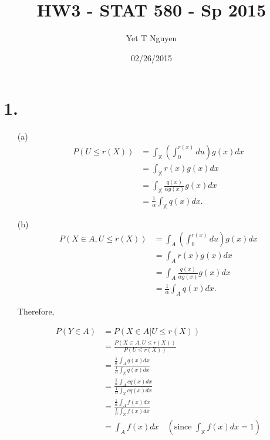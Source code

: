 \documentclass{article}\usepackage[]{graphicx}\usepackage[]{color}
\begin{document}
\title{\color{red}HW3 - STAT 580 - Sp 2015}
\author{Yet T Nguyen}
\date{02/26/2015}
\maketitle
\section*{1.}
\begin{itemize}
\item [(a)] 
\begin{align*}
P(U \leq r(X)) & = \int_\mathbb{X} \left(\int_0^{r(x)} du\right) g(x) dx\\
               & = \int_\mathbb{X} r(x)g(x)dx\\
               & = \int_\mathbb{X}\frac{q(x)}{\alpha g(x)}g(x) dx \\
               & = \frac{1}{\alpha}\int_\mathbb{X}q(x)dx.
\end{align*}


\item [(b)] 
\begin{align*}
P(X\in A, U \leq r(X)) & = \int_{A} \left(\int_0^{r(x)} du\right) g(x) dx\\
               & = \int_{A} r(x)g(x)dx\\
               & = \int_{A}\frac{q(x)}{\alpha g(x)}g(x) dx \\
               & = \frac{1}{\alpha}\int_{A}q(x)dx.
\end{align*}

Therefore, 

\begin{align*}
P(Y\in  A) &= P(X\in A|U\leq r(X)) \\
           &= \frac{P(X\in A, U \leq r(X))}{P(U \leq r(X))}\\
           &=\frac{\frac{1}{\alpha}\int_{A}q(x)dx}{\frac{1}{\alpha}\int_\mathbb{X}q(x)dx}\\
           &=\frac{\frac{1}{\alpha}\int_{A}cq(x)dx}{\frac{1}{\alpha}\int_\mathbb{X}cq(x)dx}\\ 
           &=\frac{\frac{1}{\alpha}\int_{A}f(x)dx}{\frac{1}{\alpha}\int_\mathbb{X}f(x)dx}\\ 
           &=\int_A f(x)dx \quad (\mbox{since } \int_\mathbb{X}f(x)dx = 1)
\end{align*}
\end{itemize}
\end{document}
